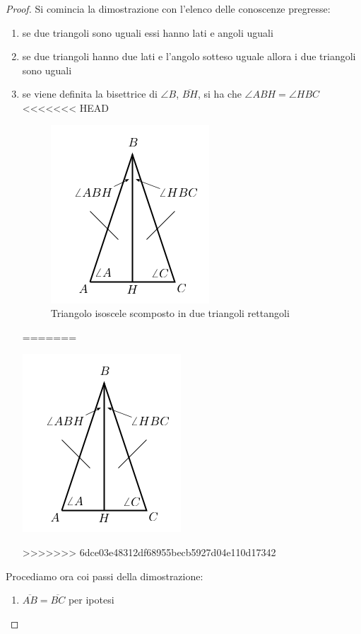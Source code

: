 \documentclass[a4paper]{book}
\begin{document}
\begin{proof}

Si comincia la dimostrazione con l'elenco delle conoscenze pregresse:
\begin{enumerate}
\item se due triangoli sono uguali essi hanno lati e angoli uguali
\item se due triangoli hanno due lati e l'angolo sotteso uguale allora i due triangoli sono uguali
\item se viene definita la bisettrice di $\angle B$, $\overline{BH}$, si ha che $\angle ABH = \angle HBC$
<<<<<<< HEAD
\begin{figure}
\centering
\caption{Triangolo isoscele scomposto in due triangoli rettangoli}
\includegraphics[scale=0.5]{img/tri2.png}
\end{figure}
=======
\begin{center}
\includegraphics[scale=0.5]{img/tri2.png}
\end{center}
>>>>>>> 6dce03e48312df68955becb5927d04e110d17342
\end{enumerate}
Procediamo ora coi passi della dimostrazione:
\begin{enumerate}
\item $\overline{AB}=\overline{BC}$ per ipotesi

\end{enumerate}
\end{proof}
\end{document}
